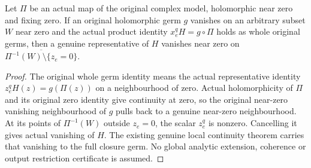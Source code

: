 \begin{theorem}
\label{hir:actual-holomorphic-product-quotient-closure-vanishing}
Let $\Pi$ be an actual map of the original complex model, holomorphic
near zero and fixing zero. If an original holomorphic germ $g$ vanishes
on an arbitrary subset $W$ near zero and the actual product identity
$x_e^qH=g\circ\Pi$ holds as whole original germs, then a genuine
representative of $H$ vanishes near zero on
$\overline{\Pi^{-1}(W)\setminus\{z_e=0\}}$.
\leanok
\end{theorem}
\begin{proof}
The original whole germ identity means the actual representative
identity $z_e^qH(z)=g(\Pi(z))$ on a neighbourhood of zero.
Actual holomorphicity of $\Pi$ and its original zero identity give
continuity at zero, so the original near-zero vanishing neighbourhood
of $g$ pulls back to a genuine near-zero neighbourhood. At its points
of $\Pi^{-1}(W)$ outside $z_e=0$, the scalar $z_e^q$ is nonzero.
Cancelling it gives actual vanishing of $H$. The existing genuine
local continuity theorem carries that vanishing to the full closure
germ. No global analytic extension, coherence or output restriction
certificate is assumed.
\end{proof}

